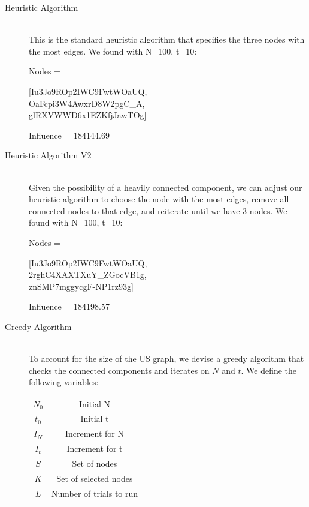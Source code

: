 \documentclass{article}
\begin{document}
			\begin{description}
				\item[Heuristic Algorithm] \hfill \\
				This is the standard heuristic algorithm that specifies the three nodes with the most edges. We found with N=100, t=10:
				
				Nodes = \begin{center}
					[Iu3Jo9ROp2IWC9FwtWOaUQ,\\
					OaFcpi3W4AwxrD8W2pgC\_A,\\
					glRXVWWD6x1EZKfjJawTOg]\\
				\end{center}
				
				Influence = 184144.69
				
				\item[Heuristic Algorithm V2] \hfill \\
				Given the possibility of a heavily connected component, we can adjust our heuristic algorithm to choose the node with the most edges, remove all connected nodes to that edge, and reiterate until we have 3 nodes. We found with N=100, t=10:
				
				Nodes = \begin{center}
					[Iu3Jo9ROp2IWC9FwtWOaUQ,\\
					2rghC4XAXTXuY\_ZGocVB1g,\\
					znSMP7mggycgF-NP1rz93g]\\
				\end{center}
				
				Influence = 184198.57
				
				\item[Greedy Algorithm] \hfill \\
				To account for the size of the US graph, we devise a greedy algorithm that checks the connected components and iterates on $N$ and $t$. We define the following variables:
				
				\begin{tabular}{|c|c|} 
					\hline
					$N_0$ & Initial N \\
					$t_0$ & Initial t \\
					$I_N$ & Increment for N \\
					$I_t$ & Increment for t \\
					$S$ & Set of nodes \\
					$K$ & Set of selected nodes \\
					$L$ & Number of trials to run\\
					\hline
				\end{tabular}	
				

\end{description}
\end{document}
